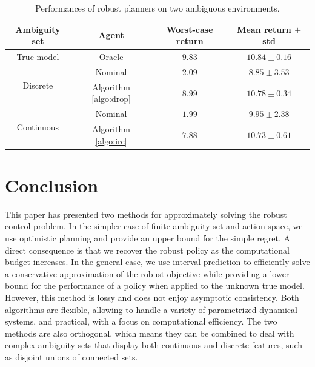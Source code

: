 \documentclass{article}
\begin{document}
\begin{table}[tp]
    \centering
    \caption{Performances of robust planners on two ambiguous environments.}
    \label{tab:experiments}
    \begin{tabular}{c c c c} \toprule
         Ambiguity set & Agent & Worst-case return & Mean return $\pm$ std  \\ \midrule
         True model & Oracle & $9.83$ & $10.84 \pm 0.16$ \\ \midrule
        \multirow{2}{*}{Discrete} & Nominal & $2.09$ & $8.85 \pm 3.53$ \\
         & Algorithm \ref{algo:drop} & \textbf{$8.99$} &  \textbf{$10.78 \pm 0.34$} \\ \midrule
        \multirow{2}{*}{Continuous} & Nominal & $1.99$ & $9.95 \pm 2.38$ \\
         & Algorithm \ref{algo:irc} & \textbf{$7.88$} & \textbf{$10.73 \pm 0.61$} \\ \bottomrule
    \end{tabular}

\vspace{-5mm}
\end{table}


\vspace{-3mm}
\section{Conclusion}


\vspace{-2mm}
This paper has presented two methods for approximately solving the robust control problem. In the simpler case of finite ambiguity set and action space, we use optimistic planning and provide an upper bound for the simple regret. A direct consequence is that we recover the robust policy as the computational budget increases. In the general case, we use interval prediction to efficiently solve a conservative approximation of the robust objective while providing a lower bound for the performance of a policy when applied to the unknown true model. However, this method is lossy and does not enjoy asymptotic consistency. Both algorithms are flexible, allowing to handle a variety of parametrized dynamical systems, and practical, with a focus on computational efficiency. The two methods are also orthogonal, which means they can be combined to deal with complex ambiguity sets that display both continuous and discrete features, such as disjoint unions of connected sets.


\vspace{-2mm}
\end{document}
